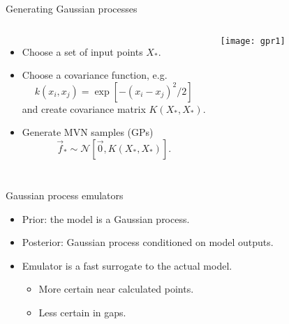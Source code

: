 \documentclass{beamer}
\begin{document}
\begin{frame}{Generating Gaussian processes}
  \begin{columns}
    \begin{itemize}
      \item Choose a set of input points $X_*$.
      \item Choose a covariance function, e.g.\
        \begin{equation*}
          k(x_i,x_j) = \exp[-(x_i-x_j)^2/2]
        \end{equation*}
        and create covariance matrix $K(X_*,X_*)$.
      \item Generate MVN samples (GPs)
        \begin{equation*}
          \vec f_* \sim \mathcal N[\vec 0,K(X_*,X_*)].
        \end{equation*}
    \end{itemize}

    \texttt{[image: gpr1]}
  \end{columns}

\end{frame}


\begin{frame}{Gaussian process emulators}
  \begin{itemize}
    \item Prior:  the model is a Gaussian process.
    \item Posterior:  Gaussian process conditioned on model outputs.
  \end{itemize}


  \hspace{-5mm}
  

  \begin{itemize}
    \item Emulator is a fast surrogate to the actual model.
      \begin{itemize}
        \item More certain near calculated points.
        \item Less certain in gaps.
      \end{itemize}
  \end{itemize}

\end{frame}
\end{document}
